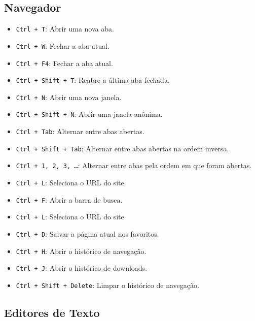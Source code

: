 \documentclass[a4paper, 12pt]{article}
\begin{document}
\subsection{Navegador}\label{navegador}

\begin{itemize}
	\item \texttt{Ctrl + T}: Abrir uma nova aba.
	\item \texttt{Ctrl + W}: Fechar a aba atual.
	\item \texttt{Ctrl + F4}: Fechar a aba atual.
	\item \texttt{Ctrl + Shift + T}: Reabre a última aba fechada.
	\item \texttt{Ctrl + N}: Abrir uma nova janela.
	\item \texttt{Ctrl + Shift + N}: Abrir uma janela anônima.
	\item \texttt{Ctrl + Tab}: Alternar entre abas abertas.
	\item \texttt{Ctrl + Shift + Tab}: Alternar entre abas abertas na ordem inversa.
	\item \texttt{Ctrl + 1, 2, 3, \ldots}: Alternar entre abas pela ordem em que foram abertas.
	\item \texttt{Ctrl + L}: Seleciona o URL do site
	\item \texttt{Ctrl + F}: Abrir a barra de busca.
	\item \texttt{Ctrl + L}: Seleciona o URL do site
    \item \texttt{Ctrl + D}: Salvar a página atual nos favoritos.
    \item \texttt{Ctrl + H}: Abrir o histórico de navegação.
    \item \texttt{Ctrl + J}: Abrir o histórico de downloads.
    \item \texttt{Ctrl + Shift + Delete}: Limpar o histórico de navegação.
\end{itemize}

\subsection{Editores de Texto}\label{editores-de-texto}
\end{document}
